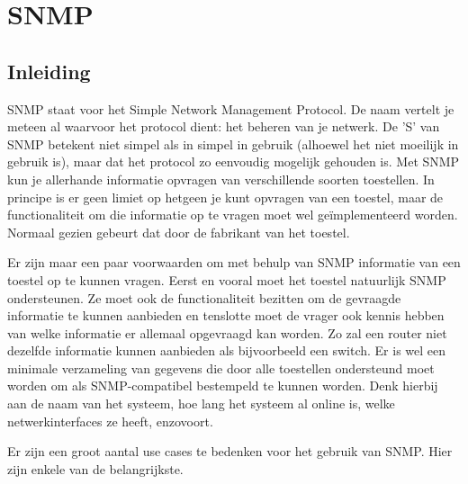 \chapter{SNMP}

\section{Inleiding}

SNMP staat voor het Simple Network Management Protocol. De naam vertelt je meteen al waarvoor het protocol dient: het beheren van je netwerk.
De 'S' van SNMP betekent niet simpel als in simpel in gebruik (alhoewel het niet moeilijk in gebruik is), maar dat het protocol zo eenvoudig mogelijk gehouden is.
Met SNMP kun je allerhande informatie opvragen van verschillende soorten toestellen. In principe is er geen limiet op hetgeen je kunt opvragen van een toestel,
maar de functionaliteit om die informatie op te vragen moet wel geïmplementeerd worden. Normaal gezien gebeurt dat door de fabrikant van het toestel.

Er zijn maar een paar voorwaarden om met behulp van SNMP informatie van een toestel op te kunnen vragen. Eerst en vooral moet het toestel natuurlijk SNMP ondersteunen.
Ze moet ook de functionaliteit bezitten om de gevraagde informatie te kunnen aanbieden en tenslotte moet de vrager ook kennis hebben van welke informatie
er allemaal opgevraagd kan worden. Zo zal een router niet dezelfde informatie kunnen aanbieden als bijvoorbeeld een switch. Er is wel een minimale
verzameling van gegevens die door alle toestellen ondersteund moet worden om als SNMP-compatibel bestempeld te kunnen worden. Denk hierbij aan de naam van het
systeem, hoe lang het systeem al online is, welke netwerkinterfaces ze heeft, enzovoort.

Er zijn een groot aantal use cases te bedenken voor het gebruik van SNMP. Hier zijn enkele van de belangrijkste.

